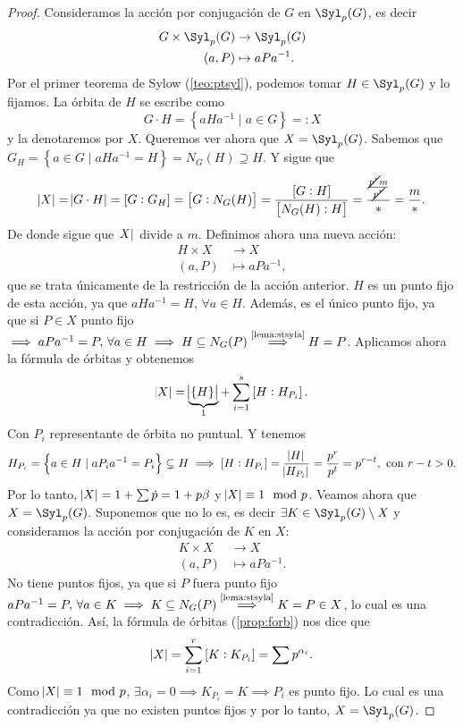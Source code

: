 \begin{proof}
    Consideramos la acción por conjugación de $G$ en $\Syl_p(G)$, es decir
    \[
        \begin{aligned}
            G \times \Syl_p(G) &\to \Syl_p(G) \\
            (a, P) &\mapsto aPa^{-1}.
        \end{aligned}
    \]
    Por el primer teorema de Sylow (\ref{teo:ptsyl}), podemos tomar $H \in \Syl_p(G)$ y lo fijamos.
    La órbita de $H$ se escribe como
    \[
        G \cdot H = \left\{ aHa^{-1} \mid a \in G \right\} =\colon X
    \]
    y la denotaremos por $X$. Queremos ver ahora que $X = \Syl_p(G)$. Sabemos que $G_H =
    \left\{ a \in G \mid aHa^{-1} = H \right\} = N_G(H) \supseteq H$. Y sigue que
    \[
        \abs{X} = \abs{G \cdot H} = \left[ G : G_H \right] = \left[ G : N_G(H) \right] =
        \frac{\left[ G : H \right]}{\left[ N_G(H) : H \right]} = 
        \frac{\frac{\cancel{p^r}m}{\cancel{p^r}}}{\ast} = \frac{m}{\ast}.
    \]
    De donde sigue que $\abs{X}$ divide a $m$. Definimos ahora una nueva acción:
    \[
        \begin{aligned}
            H \times X &\to X \\
            (a, P) &\mapsto aPa^{-1},
        \end{aligned}
    \]
    que se trata únicamente de la restricción de la acción anterior. $H$ es un punto fijo de esta acción,
    ya que $aHa^{-1} = H,\, \forall a \in H$. Además, es el único punto fijo, ya que si $P \in X$ punto fijo
    $\implies aPa^{-1} = P,\, \forall a \in H \implies H \subseteq N_G(P) 
    \stackrel{\text{\ref{lema:stsyla}}}{\implies} H = P$. Aplicamos ahora la fórmula de órbitas y obtenemos
    \[
        \abs{X} = \underbrace{\abs{ \left\{ H \right\} }}_{1} +
        \sum^s_{i=1} \left[ H : H_{P_i} \right].
    \]
    Con $P_i$ representante de órbita no puntual. Y tenemos
    \[
        H_{P_i} = \left\{ a \in H \mid aP_ia^{-1} = P_i \right\} \subsetneq H \implies
        \left[ H : H_{P_i} \right] = \frac{\abs{H}}{\abs{H_{P_i}}} = \frac{p^r}{p^t} = p^{r-t}, \text{ con } r-t > 0.
    \]
    Por lo tanto, $\abs{X} = 1 + \sum \dot{p} = 1 + p \beta$ y $\abs{X} \equiv 1 \mod p$. Veamos ahora que
    $X = \Syl_p(G)$. Suponemos que no lo es, es decir $\exists K \in \Syl_p(G) \setminus X$ y consideramos
    la acción por conjugación de $K$ en $X$:
    \[
        \begin{aligned}
            K \times X &\to X \\
            (a, P) &\mapsto aPa^{-1}.
        \end{aligned}
    \]
    No tiene puntos fijos, ya que si $P$ fuera punto fijo $aPa^{-1} = P,\, \forall a \in K \implies
    K \subseteq N_G(P) \stackrel{\text{\ref{lema:stsyla}}}{\implies} K = P \in X$, lo cual es una contradicción.
    Así, la fórmula de órbitas (\ref{prop:forb}) nos dice que
    \[
        \abs{X} = \sum^r_{i = 1} \left[ K : K_{P_i} \right] = \sum p^{\alpha_i}.
    \]
    Como $\abs{X} \equiv 1 \mod p$, $\exists \alpha_i = 0 \implies K_{P_i} = K \implies P_i$ es punto fijo.
    Lo cual es una contradicción ya que no existen puntos fijos y por lo tanto, $X = \Syl_p(G)$.


\end{proof}

